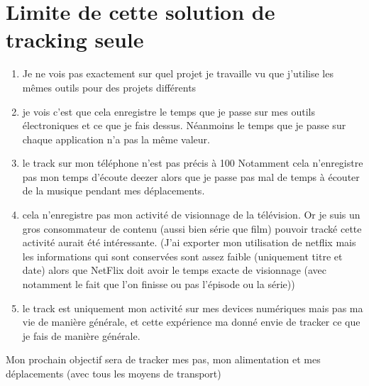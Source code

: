 \documentclass{article}
\begin{document}
\section*{Limite de cette solution de tracking seule}
\begin{enumerate}
\item Je ne vois pas exactement sur quel projet je travaille vu que j'utilise les mêmes outils pour des projets différents
\item je vois c'est que cela enregistre le temps que je passe sur mes outils électroniques et ce que je fais dessus. 
Néanmoins le temps que je passe sur chaque application n'a pas la même valeur.
\item le track sur mon téléphone n'est pas précis à 100%
Notamment cela n'enregistre pas mon temps d'écoute deezer alors que je passe pas mal de temps à écouter de la musique pendant mes déplacements.
\item  cela n'enregistre pas mon activité de visionnage de la télévision.
Or je suis un gros consommateur de contenu (aussi bien série que film) pouvoir tracké cette activité aurait été intéressante. 
(J'ai exporter mon utilisation de netflix mais les informations qui sont conservées sont assez faible (uniquement titre et date) alors que NetFlix doit avoir le temps exacte de visionnage (avec notamment le fait que l'on finisse ou pas l'épisode ou la série))
\item le track est uniquement mon activité sur mes devices numériques mais pas ma vie de manière générale, et cette expérience ma donné envie de tracker ce que je fais de manière générale.
\end{enumerate}


Mon prochain objectif sera de tracker mes pas, mon alimentation et mes déplacements (avec tous les moyens de transport) 
\end{document}

